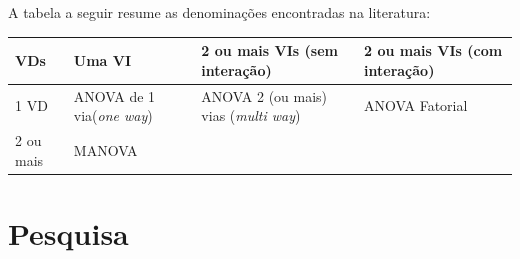 \documentclass[
]{book}
\begin{document}
A tabela a seguir resume as denominações encontradas na literatura:

\begin{longtable}[]{@{}llll@{}}
\toprule
\begin{minipage}[b]{0.16\columnwidth}\raggedright
VDs\strut
\end{minipage} & \begin{minipage}[b]{0.25\columnwidth}\raggedright
Uma VI\strut
\end{minipage} & \begin{minipage}[b]{0.23\columnwidth}\raggedright
2 ou mais VIs (sem interação)\strut
\end{minipage} & \begin{minipage}[b]{0.25\columnwidth}\raggedright
2 ou mais VIs (com interação)\strut
\end{minipage}\tabularnewline
\midrule
\endhead
\begin{minipage}[t]{0.16\columnwidth}\raggedright
1 VD\strut
\end{minipage} & \begin{minipage}[t]{0.25\columnwidth}\raggedright
ANOVA de 1 via(\emph{one way})\strut
\end{minipage} & \begin{minipage}[t]{0.23\columnwidth}\raggedright
ANOVA 2 (ou mais) vias (\emph{multi way})\strut
\end{minipage} & \begin{minipage}[t]{0.25\columnwidth}\raggedright
ANOVA Fatorial\strut
\end{minipage}\tabularnewline
\begin{minipage}[t]{0.16\columnwidth}\raggedright
2 ou mais\strut
\end{minipage} & \begin{minipage}[t]{0.25\columnwidth}\raggedright
MANOVA\strut
\end{minipage} & \begin{minipage}[t]{0.23\columnwidth}\raggedright
\strut
\end{minipage} & \begin{minipage}[t]{0.25\columnwidth}\raggedright
\strut
\end{minipage}\tabularnewline
\bottomrule
\end{longtable}

\hypertarget{pesquisa-4}{%
\section{Pesquisa}\label{pesquisa-4}}
\end{document}
